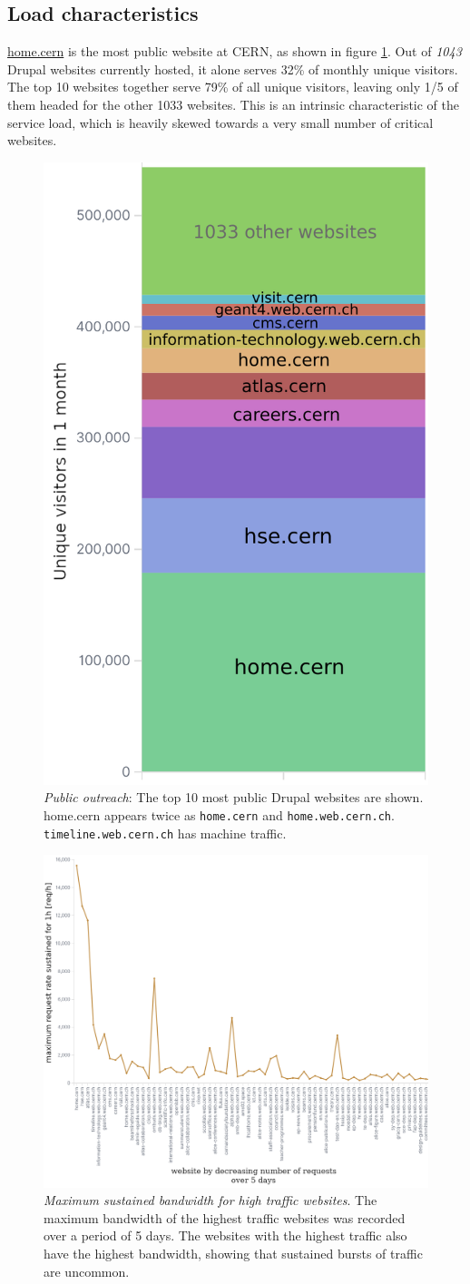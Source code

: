 \subsection{Load characteristics}

\href{https://home.cern/}{home.cern} is the most public website at CERN, as shown in figure \ref{fig-drp-top10-cip}.
Out of \emph{1043} Drupal websites currently hosted, it alone serves 32\% of monthly unique visitors.
The top 10 websites together serve 79\% of all unique visitors, leaving only 1/5 of them headed for the other 1033 websites.
This is an intrinsic characteristic of the service load, which is heavily skewed towards a very small number of critical websites.

\begin{figure}
\includegraphics[width=.32\textwidth]{figures/drupal-top10-uniqClientIP.png}
\caption{\emph{Public outreach}: 
    The top 10 most public Drupal websites are shown.
    home.cern appears twice as \texttt{home.cern} and \texttt{home.web.cern.ch}.
    {\color{amethyst} \texttt{timeline.web.cern.ch}} has machine traffic.}
\label{fig-drp-top10-cip}
\end{figure}

\begin{figure}[b]
    \centering
    \includegraphics[width=.80\textwidth]{figures/website-bandwidth}
    \caption{\emph{Maximum sustained bandwidth for high traffic websites}.
      The maximum bandwidth of the highest traffic websites was recorded over a period of 5 days.
      The websites with the highest traffic also have the highest bandwidth, showing that sustained bursts of traffic are uncommon.}
    \label{fig:website_bandwidth}
\end{figure}

